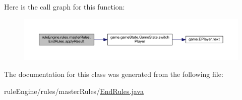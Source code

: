 Here is the call graph for this function\+:
\nopagebreak
\begin{figure}[H]
\begin{center}
\leavevmode
\includegraphics[width=350pt]{classrule_engine_1_1rules_1_1master_rules_1_1_end_rules_a41820fbefc132761e0190e435ee48bc6_cgraph}
\end{center}
\end{figure}


The documentation for this class was generated from the following file\+:\begin{DoxyCompactItemize}
\item 
rule\+Engine/rules/master\+Rules/\mbox{\hyperlink{_end_rules_8java}{End\+Rules.\+java}}\end{DoxyCompactItemize}
